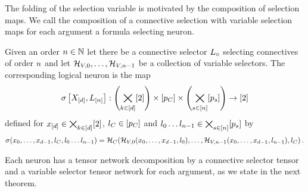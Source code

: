 The folding of the selection variable is motivated by the composition of selection maps.
We call the composition of a connective selection with variable selection maps for each argument a formula selecting neuron.


\begin{definition}\label{def:fsNeuron}
	Given an order $n\in\mathbb{N}$ let there be a connective selector $L_{\circ}$ selecting connectives of order $n$ and let $\mathcal{H}_{V,0},\ldots,\mathcal{H}_{V,n-1}$ be a collection of variable selectors.
	The corresponding logical neuron is the map
	\begin{align*}
		\sigma\left[X_{[d]},L_{[n]}\right] 
		: \left(\bigtimes_{k\in[d]}[2]\right) \times [p_{C}] \times \left( \bigtimes_{s\in[n]} [p_{s}]\right) \rightarrow [2] 
	\end{align*}
	defined for $x_{[d]}\in\bigtimes_{k\in[d]}[2]$, $l_{C}\in[p_{C}]$ and 
	$l_{0}\ldots l_{n-1}\in \bigtimes_{s\in[n]} [p_{s}]$ by
	\begin{align*}
		\sigma({x_{0},\ldots,x_{d-1}}, l_{C}, l_{0}\ldots l_{n-1}) = 
		\mathcal{H}_{C}(\mathcal{H}_{V,0}({x_{0},\ldots,x_{d-1}}, l_{0}),\ldots,\mathcal{H}_{V,n-1}({x_{0},\ldots,x_{d-1}},l_{n-1}), l_{C}) \, .
	\end{align*}
\end{definition}

Each neuron has a tensor network decomposition by a connective selector tensor and a variable selector tensor network for each argument, as we state in the next theorem.

